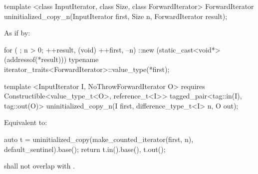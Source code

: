 {\color{remclr}
\begin{codeblock}
template <class InputIterator, class Size, class ForwardIterator>
  ForwardIterator uninitialized_copy_n(InputIterator first, Size n,
                                       ForwardIterator result);
\end{codeblock}

\setcounter{Paras}{2}
\pnum
\effects As if by:
\begin{codeblock}
        for ( ; n > 0; ++result, (void) ++first, --n) {
          ::new (static_cast<void*>(addressof(*result)))
            typename iterator_traits<ForwardIterator>::value_type(*first);
        }
\end{codeblock}

\pnum
\returns {}
} %

{\color{addclr}
\begin{codeblock}
template <InputIterator I, NoThrowForwardIterator O>
  requires
Constructible<value_type_t<O>, reference_t<I>>
  tagged_pair<tag::in(I), tag::out(O)> uninitialized_copy_n(I first, difference_type_t<I> n, O out);
\end{codeblock}

\setcounter{Paras}{4}
\pnum
\effects Equivalent to:
\begin{codeblock}
    auto t = uninitialized_copy(make_counted_iterator(first, n), default_sentinel{}).base();
    return {t.in().base(), t.out()};
\end{codeblock}

\pnum
\requires {} shall not overlap with .
} %

